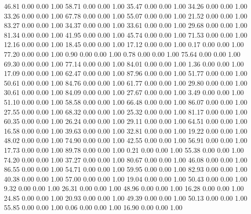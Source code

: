    46.81   0.00   0.00   1.00
   58.71   0.00   0.00   1.00
   35.47   0.00   0.00   1.00
   34.26   0.00   0.00   1.00
   33.26   0.00   0.00   1.00
   67.78   0.00   0.00   1.00
   55.07   0.00   0.00   1.00
   21.52   0.00   0.00   1.00
   83.27   0.00   0.00   1.00
   34.37   0.00   0.00   1.00
   33.61   0.00   0.00   1.00
   29.68   0.00   0.00   1.00
   81.34   0.00   0.00   1.00
   41.95   0.00   0.00   1.00
   45.74   0.00   0.00   1.00
   71.53   0.00   0.00   1.00
   12.16   0.00   0.00   1.00
   18.45   0.00   0.00   1.00
   17.12   0.00   0.00   1.00
    0.17   0.00   0.00   1.00
   77.20   0.00   0.00   1.00
    0.90   0.00   0.00   1.00
    0.78   0.00   0.00   1.00
   75.64   0.00   0.00   1.00
   69.30   0.00   0.00   1.00
   77.14   0.00   0.00   1.00
   84.01   0.00   0.00   1.00
    1.36   0.00   0.00   1.00
   17.09   0.00   0.00   1.00
   62.47   0.00   0.00   1.00
   87.96   0.00   0.00   1.00
   51.77   0.00   0.00   1.00
   50.61   0.00   0.00   1.00
   84.76   0.00   0.00   1.00
   61.77   0.00   0.00   1.00
   29.80   0.00   0.00   1.00
   30.61   0.00   0.00   1.00
   84.09   0.00   0.00   1.00
   27.67   0.00   0.00   1.00
    3.49   0.00   0.00   1.00
   51.10   0.00   0.00   1.00
   58.58   0.00   0.00   1.00
   66.48   0.00   0.00   1.00
   86.07   0.00   0.00   1.00
   27.55   0.00   0.00   1.00
   68.32   0.00   0.00   1.00
   25.32   0.00   0.00   1.00
   81.17   0.00   0.00   1.00
   60.35   0.00   0.00   1.00
   26.24   0.00   0.00   1.00
   29.11   0.00   0.00   1.00
   64.51   0.00   0.00   1.00
   16.58   0.00   0.00   1.00
   39.63   0.00   0.00   1.00
   32.81   0.00   0.00   1.00
   19.22   0.00   0.00   1.00
   48.02   0.00   0.00   1.00
   74.90   0.00   0.00   1.00
   42.55   0.00   0.00   1.00
   56.91   0.00   0.00   1.00
   17.73   0.00   0.00   1.00
   89.78   0.00   0.00   1.00
    0.21   0.00   0.00   1.00
   55.38   0.00   0.00   1.00
   74.20   0.00   0.00   1.00
   37.27   0.00   0.00   1.00
   80.67   0.00   0.00   1.00
   46.08   0.00   0.00   1.00
   86.55   0.00   0.00   1.00
   54.71   0.00   0.00   1.00
   59.95   0.00   0.00   1.00
   82.93   0.00   0.00   1.00
   40.38   0.00   0.00   1.00
   57.00   0.00   0.00   1.00
   19.04   0.00   0.00   1.00
   50.43   0.00   0.00   1.00
    9.32   0.00   0.00   1.00
   26.31   0.00   0.00   1.00
   48.96   0.00   0.00   1.00
   16.28   0.00   0.00   1.00
   24.85   0.00   0.00   1.00
   20.93   0.00   0.00   1.00
   49.39   0.00   0.00   1.00
   50.13   0.00   0.00   1.00
   55.85   0.00   0.00   1.00
    0.06   0.00   0.00   1.00
   16.90   0.00   0.00   1.00
